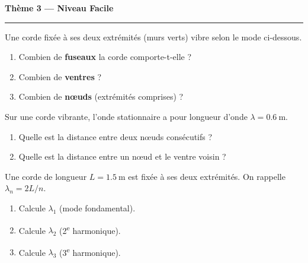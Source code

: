 \documentclass[11pt,a4paper]{article}
\begin{document}
\begin{center}
{\large\bfseries\color{primarydark} Thème 3 — Niveau Facile}\\[-2pt]
{\color{primary}\rule{5cm}{1pt}}
\end{center}

\begin{exo}
Une corde fixée à ses deux extrémités (murs verts) vibre selon le mode ci-dessous.
\begin{center}
\end{center}
\begin{enumerate}[label=\alph*)]
  \item Combien de \textbf{fuseaux} la corde comporte-t-elle ?
  \item Combien de \textbf{ventres} ?
  \item Combien de \textbf{nœuds} (extrémités comprises) ?
\end{enumerate}
\end{exo}

\begin{exo}
Sur une corde vibrante, l'onde stationnaire a pour longueur d'onde $\lambda=\SI{0.6}{\metre}$.
\begin{enumerate}[label=\alph*)]
  \item Quelle est la distance entre deux nœuds consécutifs ?
  \item Quelle est la distance entre un nœud et le ventre voisin ?
\end{enumerate}
\end{exo}

\begin{exo}
Une corde de longueur $L=\SI{1.5}{\metre}$ est fixée à ses deux extrémités. On rappelle
$\lambda_n=2L/n$.
\begin{enumerate}[label=\alph*)]
  \item Calcule $\lambda_1$ (mode fondamental).
  \item Calcule $\lambda_2$ (2\textsuperscript{e} harmonique).
  \item Calcule $\lambda_3$ (3\textsuperscript{e} harmonique).
\end{enumerate}
\end{exo}
\end{document}
